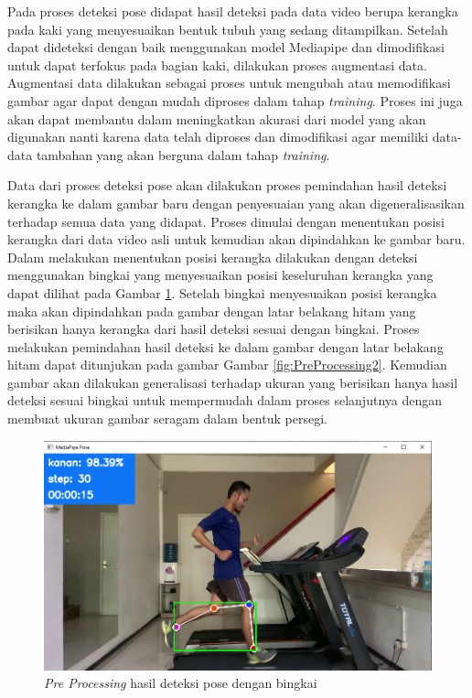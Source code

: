 Pada proses deteksi pose didapat hasil deteksi pada data video berupa kerangka pada kaki yang menyesuaikan bentuk tubuh yang sedang ditampilkan. Setelah dapat dideteksi dengan baik menggunakan model Mediapipe dan dimodifikasi untuk dapat terfokus pada bagian kaki, dilakukan proses augmentasi data. Augmentasi data dilakukan sebagai proses untuk mengubah atau memodifikasi gambar agar dapat dengan mudah diproses dalam tahap \emph{training}. Proses ini juga akan dapat membantu dalam meningkatkan akurasi dari model yang akan digunakan nanti karena data telah diproses dan dimodifikasi agar memiliki data-data tambahan yang akan berguna dalam tahap \emph{training}. 

Data dari proses deteksi pose akan dilakukan proses pemindahan hasil deteksi kerangka ke dalam gambar baru dengan penyesuaian yang akan digeneralisasikan terhadap semua data yang didapat. Proses dimulai dengan menentukan posisi kerangka dari data video asli untuk kemudian akan dipindahkan ke gambar baru. Dalam melakukan menentukan posisi kerangka dilakukan dengan deteksi menggunakan bingkai yang menyesuaikan posisi keseluruhan kerangka yang dapat dilihat pada Gambar \ref{fig:PreProcessing1}. Setelah bingkai menyesuaikan posisi kerangka maka akan dipindahkan pada gambar dengan latar belakang hitam yang berisikan hanya kerangka dari hasil deteksi sesuai dengan bingkai. Proses melakukan pemindahan hasil deteksi ke dalam gambar dengan latar belakang hitam dapat ditunjukan pada gambar Gambar \ref{fig:PreProcessing2}. Kemudian gambar akan dilakukan generalisasi terhadap ukuran yang berisikan hanya hasil deteksi sesuai bingkai untuk mempermudah dalam proses selanjutnya dengan membuat ukuran gambar seragam dalam bentuk persegi.

\begin{figure}[H]
  \centering
  \includegraphics[scale=0.48]{gambar/deteksi pose2.png}
  \caption{\emph{Pre Processing} hasil deteksi pose dengan bingkai}
  \label{fig:PreProcessing1}
\end{figure}

